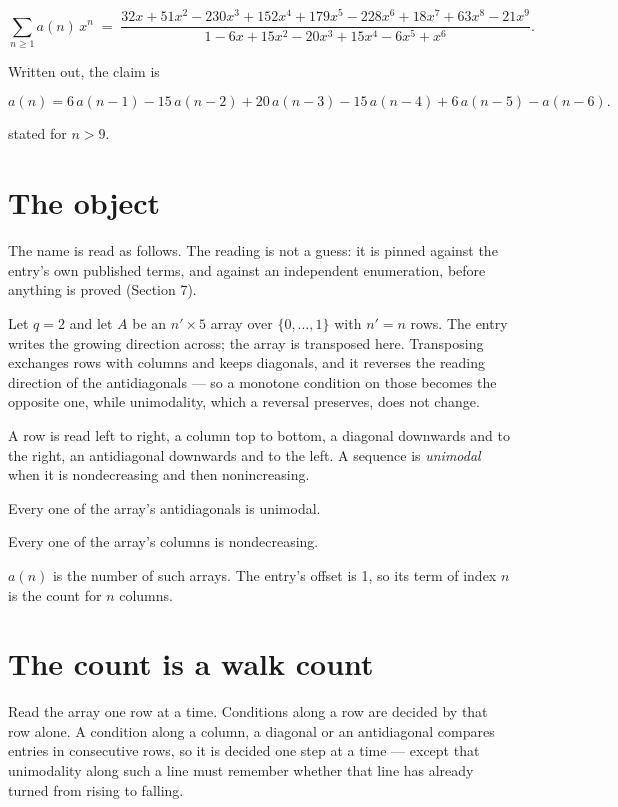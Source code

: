 \documentclass[11pt]{article}
\theoremstyle{definition}
\begin{document}
\[\sum_{n \ge 1} a(n)\,x^n \;=\; \frac{32x + 51x^{2} - 230x^{3} + 152x^{4} + 179x^{5} - 228x^{6} + 18x^{7} + 63x^{8} - 21x^{9}}{1 - 6x + 15x^{2} - 20x^{3} + 15x^{4} - 6x^{5} + x^{6}}.\]

Written out, the claim is

\[a(n) = 6\,a(n-1) - 15\,a(n-2) + 20\,a(n-3) - 15\,a(n-4) + 6\,a(n-5) - a(n-6).\]

stated for $n > 9$.

\section{The object}

The name is read as follows. The reading is not a guess: it is pinned against the entry's own published terms, and against an independent enumeration, before anything is proved (Section 7).

Let $q = 2$ and let $A$ be an $n' \times 5$ array over $\{0,\dots,1\}$ with $n' = n$ rows. The entry writes the growing direction across; the array is transposed here. Transposing exchanges rows with columns and keeps diagonals, and it reverses the reading direction of the antidiagonals --- so a monotone condition on those becomes the opposite one, while unimodality, which a reversal preserves, does not change.

A row is read left to right, a column top to bottom, a diagonal downwards and to the right, an antidiagonal downwards and to the left. A sequence is {\itshape unimodal} when it is nondecreasing and then nonincreasing.

Every one of the array's antidiagonals is unimodal.

Every one of the array's columns is nondecreasing.

$a(n)$ is the number of such arrays. The entry's offset is 1, so its term of index $n$ is the count for $n$ columns.

\section{The count is a walk count}

Read the array one row at a time. Conditions along a row are decided by that row alone. A condition along a column, a diagonal or an antidiagonal compares entries in consecutive rows, so it is decided one step at a time --- except that unimodality along such a line must remember whether that line has already turned from rising to falling.
\end{document}
